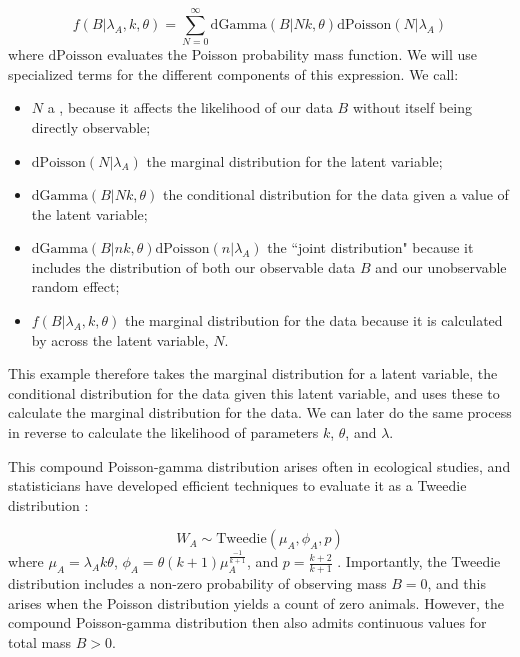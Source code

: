 \begin{equation} \label{eq:Chap2_Compound_Poisson_Gamma}
    f( B | \lambda_A, k, \theta ) = \sum_{N=0}^{\infty} \mathrm{dGamma}( B | Nk, \theta ) \mathrm{dPoisson}(N|\lambda_A) 
\end{equation}
where \(\mathrm{dPoisson}\) evaluates the Poisson probability mass function.  We will use specialized terms for the different components of this expression.  We call:
\begin{itemize}
    \item \( N \) a , because it affects the likelihood of our data \(B\) without itself being directly observable;

    \item \(\mathrm{dPoisson}(N|\lambda_A)\) the marginal distribution for the latent variable;

    \item \(\mathrm{dGamma}( B | Nk, \theta )\) the conditional distribution for the data given a value of the latent variable;
    
    \item \( \mathrm{dGamma}( B | nk, \theta ) \mathrm{dPoisson}(n|\lambda_A) \) the ``joint distribution" because it includes the distribution of both our observable data \(B\) and our unobservable random effect;

    \item \( f( B | \lambda_A, k, \theta ) \) the marginal distribution for the data because it is calculated by  across the latent variable, \(N\).  
\end{itemize}
This example therefore takes the marginal distribution for a latent variable, the conditional distribution for the data given this latent variable, and uses these to calculate the marginal distribution for the data.  We can later do the same process in reverse to calculate the likelihood of parameters \(k\), \(\theta\), and \(\lambda\).  

This compound Poisson-gamma distribution arises often in ecological studies, and statisticians have developed efficient techniques to evaluate it as a Tweedie distribution \cite{foster_poissongamma_2013}:

\begin{equation}
    W_A \sim \mathrm{Tweedie}( \mu_A, \phi_A, p )
\end{equation}
where \( \mu_A = \lambda_A k \theta \), \( \phi_A = \theta(k+1)\mu_A^\frac{-1}{k+1} \), and \( p = \frac{k+2}{k+1} \) \cite{thorson_diet_2022}.  
Importantly, the Tweedie distribution includes a non-zero probability of observing mass \(B=0\), and this arises when the Poisson distribution yields a count of zero animals.  However, the compound Poisson-gamma distribution then also admits continuous values for total mass \(B>0\).  

